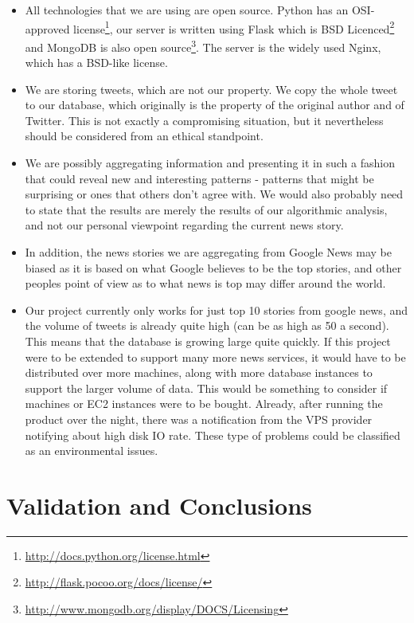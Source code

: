 \documentclass{report}
\begin{document}
	\begin{itemize}

	  \item All technologies that we are using are open source. Python has an OSI-approved license\footnote{\url {http://docs.python.org/license.html}}, our server is written using Flask which is BSD Licenced\footnote{\url{http://flask.pocoo.org/docs/license/}} and MongoDB is also open source\footnote{\url{http://www.mongodb.org/display/DOCS/Licensing}}. The server is the widely used Nginx, which has a BSD-like license.

		\item We are storing tweets, which are not our property. We copy the whole tweet to our database, which originally is the property of the original author and of Twitter. This is not exactly a compromising situation, but it nevertheless should be considered from an ethical standpoint.

		\item We are possibly aggregating information and presenting it in such a fashion that could reveal new and interesting patterns - patterns that might be surprising or ones that others don't agree with. We would also probably need to state that the results are merely the results of our algorithmic analysis, and not our personal viewpoint regarding the current news story.

		\item In addition, the news stories we are aggregating from Google News may be biased as it is based on what Google believes to be the top stories, and other peoples point of view as to what news is top may differ around the world.

		\item Our project currently only works for just top 10 stories from google news, and the volume of tweets is already quite high (can be as high as 50 a second). This means that the database is growing large quite quickly. If this project were to be extended to support many more news services, it would have to be distributed over more machines, along with more database instances to support the larger volume of data. This would be something to consider if machines or EC2 instances were to be bought. Already, after running the product over the night, there was a notification from the VPS provider notifying about high disk IO rate. These type of problems could be classified as an environmental issues.
	\end{itemize}
	
	
	\chapter{Validation and Conclusions}
	
\end{document}
